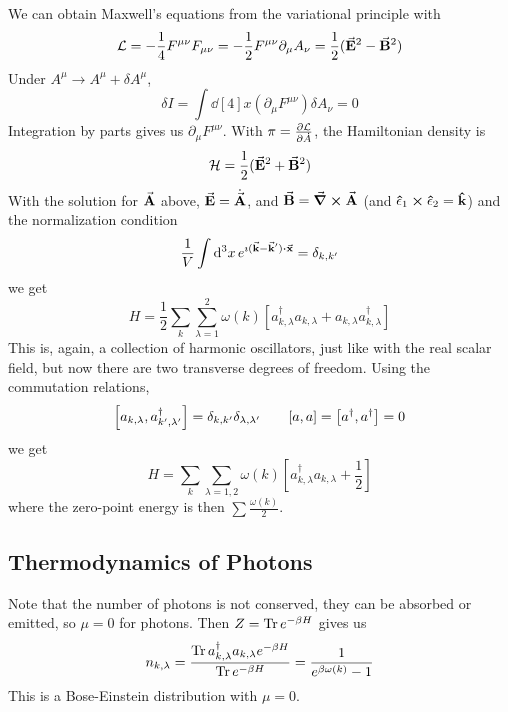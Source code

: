 \documentclass[a4paper,twoside,master.tex]{subfiles}
\begin{document}
We can obtain Maxwell's equations from the variational principle with
\begin{equation}
    \mathcal{L} = - \frac{1}{4} F^{\mu \nu} F_{\mu \nu} = - \frac{1}{2} F^{\mu \nu} \partial_{\mu} A_{\nu} = \frac{1}{2} (\va{E}^2 - \va{B}^2)
\end{equation}
Under $ A^{\mu} \to A^{\mu} + \delta A^{\mu} $,
\begin{equation}
    \delta I = \int \dd[4]{x} (\partial_{\mu} F^{\mu \nu}) \delta A_{\nu} = 0
\end{equation}
Integration by parts gives us $ \partial_{\mu} F^{\mu \nu} $. With $ \pi = \pdv{\mathcal{L}}{\dot{A}} $, the Hamiltonian density is
\begin{equation}
    \mathcal{H} = \frac{1}{2} (\va{E}^2 + \va{B}^2)
\end{equation}
With the solution for $ \va{A} $ above, $ \va{E} = \dot{\va{A}} $, and $ \va{B} = \curl{\va{A}} $ (and $ \vu{\epsilon}_1 \cross \vu{\epsilon}_2 = \vu{k} $) and the normalization condition
\begin{equation}
    \frac{1}{V} \int \dd[3]{x}e^{\imath (\va{k} - \va{k}') \vdot \va{x}} = \delta_{k, k'}
\end{equation}
we get
\begin{equation}
    H = \frac{1}{2} \sum_k \sum_{\lambda = 1}^2 \omega(k) \left[ a^\dagger_{k, \lambda} a_{k, \lambda} + a_{k, \lambda} a^\dagger_{k, \lambda} \right]
\end{equation}
This is, again, a collection of harmonic oscillators, just like with the real scalar field, but now there are two transverse degrees of freedom. Using the commutation relations,
\begin{equation}
    \comm{a_{k, \lambda}}{a^\dagger_{k', \lambda'}} = \delta_{k,k'} \delta_{\lambda, \lambda'} \qquad \comm{a}{a} = \comm{a^\dagger}{a^\dagger} = 0
\end{equation}
we get
\begin{equation}
    H = \sum_k \sum_{\lambda = 1,2} \omega(k) \left[ a^\dagger_{k, \lambda} a_{k, \lambda} + \frac{1}{2} \right]
\end{equation}
where the zero-point energy is then $ \sum \frac{\omega(k)}{2} $.

\subsection{Thermodynamics of Photons}\label{sub:thermodynamics_of_photons}

Note that the number of photons is not conserved, they can be absorbed or emitted, so $ \mu = 0 $ for photons. Then $ Z = \Tr e^{- \beta H} $ gives us
\begin{equation}
    n_{k, \lambda} = \frac{\Tr a^\dagger_{k, \lambda} a_{k, \lambda} e^{- \beta H}}{\Tr e^{- \beta H}} = \frac{1}{e^{\beta \omega(k)} - 1}
\end{equation}
This is a Bose-Einstein distribution with $ \mu = 0 $.
\end{document}
